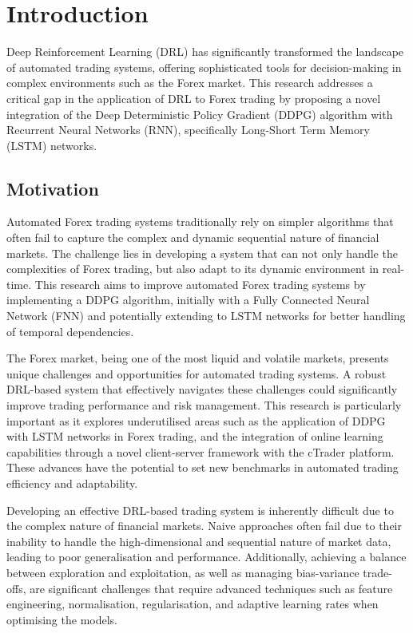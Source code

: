 \section{Introduction}

Deep Reinforcement Learning (DRL) has significantly transformed the landscape of automated trading systems, offering sophisticated tools for decision-making in complex environments such as the Forex market. This research addresses a critical gap in the application of DRL to Forex trading by proposing a novel integration of the Deep Deterministic Policy Gradient (DDPG) algorithm with Recurrent Neural Networks (RNN), specifically Long-Short Term Memory (LSTM) networks.

\subsection{Motivation}

Automated Forex trading systems traditionally rely on simpler algorithms that often fail to capture the complex and dynamic sequential nature of financial markets. The challenge lies in developing a system that can not only handle the complexities of Forex trading, but also adapt to its dynamic environment in real-time. This research aims to improve automated Forex trading systems by implementing a DDPG algorithm, initially with a Fully Connected Neural Network (FNN) and potentially extending to LSTM networks for better handling of temporal dependencies.

The Forex market, being one of the most liquid and volatile markets, presents unique challenges and opportunities for automated trading systems. A robust DRL-based system that effectively navigates these challenges could significantly improve trading performance and risk management. This research is particularly important as it explores underutilised areas such as the application of DDPG with LSTM networks in Forex trading, and the integration of online learning capabilities through a novel client-server framework with the cTrader \cite{noauthor_forex_nodate} platform. These advances have the potential to set new benchmarks in automated trading efficiency and adaptability.

Developing an effective DRL-based trading system is inherently difficult due to the complex nature of financial markets. Naive approaches often fail due to their inability to handle the high-dimensional and sequential nature of market data, leading to poor generalisation and performance. Additionally, achieving a balance between exploration and exploitation, as well as managing bias-variance trade-offs, are significant challenges that require advanced techniques such as feature engineering, normalisation, regularisation, and adaptive learning rates when optimising the models.

